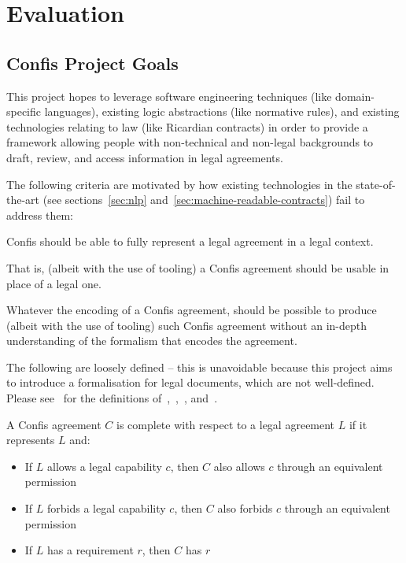 
\chapter{Evaluation}\label{ch:evaluation}


\section{Confis Project Goals}\label{sec:eval:goals}

This project hopes to leverage software engineering techniques (like domain-specific languages), existing logic abstractions (like normative rules), and existing technologies relating to law (like Ricardian contracts) in order to provide a framework allowing people with non-technical and non-legal backgrounds to draft, review, and access information in legal agreements.

The following criteria are motivated by how existing technologies in the state-of-the-art (see sections~\ref{sec:nlp} and~\ref{sec:machine-readable-contracts}) fail to address them:

\begin{definition}
    \label{def:meaningful-representation}
    Confis should be able to fully represent a legal agreement in a legal context.

    That is, (albeit with the use of tooling) a Confis agreement should be usable in place of a legal one.

\end{definition}

\begin{definition}[Accessibility]
    \label{def:accessibility}
    Whatever the encoding of a Confis agreement, should be possible to produce (albeit with the use of tooling) such Confis agreement without an in-depth understanding of the formalism that encodes the agreement.
\end{definition}

The following are loosely defined -- this is unavoidable because this project aims to introduce a formalisation for legal documents, which are not well-defined.
Please see~ for the definitions of~,~,~, and~.

\begin{definition}[Completeness]
    \label{def:completeness}
    A Confis agreement $C$ is complete with respect to a legal agreement $L$ if it represents $L$ and:

    \begin{itemize}
        \item If $L$ allows a legal capability $c$, then $C$ also allows $c$ through an equivalent permission
        \item If $L$ forbids a legal capability $c$, then $C$ also forbids $c$ through an equivalent permission
        \item If $L$ has a requirement $r$, then $C$ has $r$
    \end{itemize}
\end{definition}


